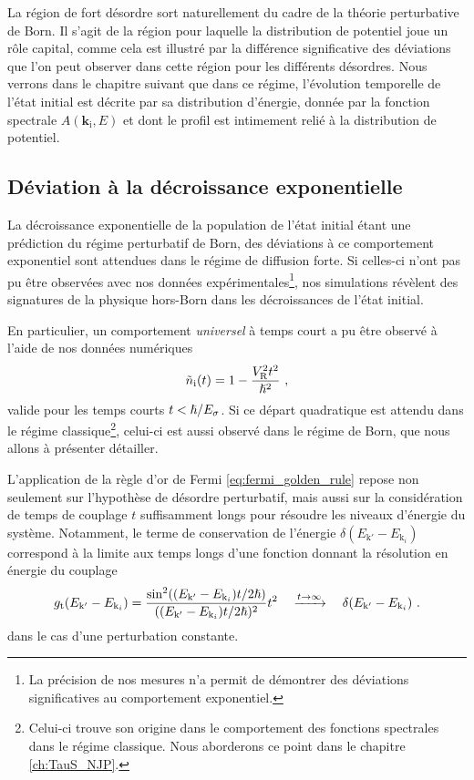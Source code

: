 La région de fort désordre sort naturellement du cadre de la théorie perturbative de Born. Il s'agit de la région pour laquelle la distribution de potentiel joue un rôle capital, comme cela est illustré par la différence significative des déviations que l'on peut observer dans cette région pour les différents désordres. Nous verrons dans le chapitre suivant que dans ce régime, l'évolution temporelle de l'état initial est décrite par sa distribution d'énergie, donnée par la fonction spectrale $A(\mathbf{k}_{\mathrm{i}},E)$ et dont le profil est intimement relié à la distribution de potentiel.


\subsection{Déviation à la décroissance exponentielle}
La décroissance exponentielle de la population de l'état initial étant une prédiction du régime perturbatif de Born, des déviations à ce comportement exponentiel sont attendues dans le régime de diffusion forte. Si celles-ci n'ont pas pu être observées avec nos données expérimentales\footnote{La précision de nos mesures n'a permit de démontrer des déviations significatives au comportement exponentiel.}, nos simulations révèlent des signatures de la physique hors-Born dans les décroissances de l'état initial.

En particulier, un comportement \emph{universel} à temps court a pu être observé à l'aide de nos données numériques
\begin{equation}
\tilde{n}_{\mathrm{i}}(t)=1-\frac{V_{\mathrm{R}}^2t^2}{\hslash^2} \text{ ,}
\label{eq:depart_quadratique}
\end{equation}
valide pour les temps courts $t<\hslash/E_{\sigma}$. Si ce départ quadratique est attendu dans le régime classique\footnote{Celui-ci trouve son origine dans le comportement des fonctions spectrales dans le régime classique. Nous aborderons ce point dans le chapitre \ref{ch:TauS_NJP}.}, celui-ci est aussi observé dans le régime de Born, que nous allons à présenter détailler.

L'application de la règle d'or de Fermi \ref{eq:fermi_golden_rule} repose non seulement sur l'hypothèse de désordre perturbatif, mais aussi sur la considération de temps de couplage $t$ suffisamment longs pour résoudre les niveaux d'énergie du système. Notamment, le terme de conservation de l'énergie $\delta(E_{\mathrm{k}'} - E_{\mathrm{k}_i})$ correspond à la limite aux temps longs d'une fonction donnant la résolution en énergie du couplage \citep{grynberg2010introduction}
\begin{equation}
g_{\mathrm{t}}(E_{\mathrm{k}'} - E_{\mathrm{k}_i}) = \frac{\sin^2((E_{\mathrm{k}'} - E_{\mathrm{k}_i})t/2\hslash)}{((E_{\mathrm{k}'} - E_{\mathrm{k}_i})t/2\hslash)^2} t^2 \quad \xrightarrow{t\to\infty} \quad \delta(E_{\mathrm{k}'} - E_{\mathrm{k}_i}) \text{ .}
\end{equation}
dans le cas d'une perturbation constante.

